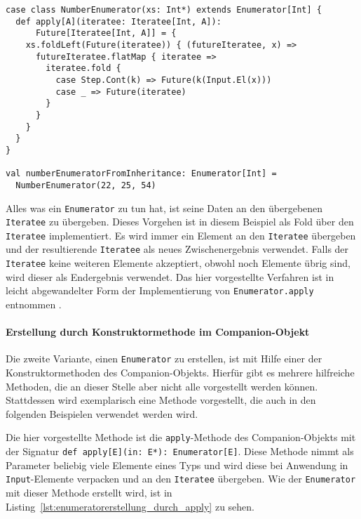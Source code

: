 \begin{lstlisting}[caption=Erstellung eines Enumerators durch Vererbung, label=lst:enumeratorerstellung_durch_vererbung]
case class NumberEnumerator(xs: Int*) extends Enumerator[Int] {
  def apply[A](iteratee: Iteratee[Int, A]):
      Future[Iteratee[Int, A]] = {
    xs.foldLeft(Future(iteratee)) { (futureIteratee, x) =>
      futureIteratee.flatMap { iteratee =>
        iteratee.fold {
          case Step.Cont(k) => Future(k(Input.El(x)))
          case _ => Future(iteratee)
        }
      }
    }
  }
}

val numberEnumeratorFromInheritance: Enumerator[Int] =
  NumberEnumerator(22, 25, 54)
\end{lstlisting}

Alles was ein \lstinline|Enumerator| zu tun hat, ist seine Daten an den übergebenen \lstinline|Iteratee| zu übergeben.
Dieses Vorgehen ist in diesem Beispiel als Fold über den \lstinline|Iteratee| implementiert.
Es wird immer ein Element an den \lstinline|Iteratee| übergeben und der resultierende \lstinline|Iteratee| als neues Zwischenergebnis verwendet.
Falls der \lstinline|Iteratee| keine weiteren Elemente akzeptiert, obwohl noch Elemente übrig sind, wird dieser als Endergebnis verwendet.
Das hier vorgestellte Verfahren ist in leicht abgewandelter Form der Implementierung von \lstinline|Enumerator.apply| entnommen \cite[vgl.][Z.~611 und Z.~654]{play_enumerator_source_code}.


\paragraph{Erstellung durch Konstruktormethode im Companion-Objekt} %
\label{par:erstellung_durch_konstruktormethode_im_companion-object}\mbox{} %

Die zweite Variante, einen \lstinline|Enumerator| zu erstellen, ist mit Hilfe einer der Konstruktormethoden des Companion-Objekts.
Hierfür gibt es mehrere hilfreiche Methoden, die an dieser Stelle aber nicht alle vorgestellt werden können.
Stattdessen wird exemplarisch eine Methode vorgestellt, die auch in den folgenden Beispielen verwendet werden wird.

Die hier vorgestellte Methode ist die \lstinline|apply|-Methode des Companion-Objekts mit der Signatur \lstinline[breaklines=true]|def apply[E](in: E*): Enumerator[E]|.
Diese Methode nimmt als Parameter beliebig viele Elemente eines Typs und wird diese bei Anwendung in \lstinline|Input|-Elemente verpacken und an den \lstinline|Iteratee| übergeben.
Wie der \lstinline|Enumerator| mit dieser Methode erstellt wird, ist in Listing~\ref{lst:enumeratorerstellung_durch_apply} zu sehen.

